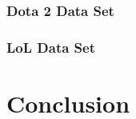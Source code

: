 \documentclass[sigconf]{acmart}
\begin{document}
\subsubsection{Dota 2 Data Set }

\subsubsection{LoL Data Set}

\section{Conclusion}

%



\begin{thebibliography}{9}


\end{thebibliography}
\end{document}
